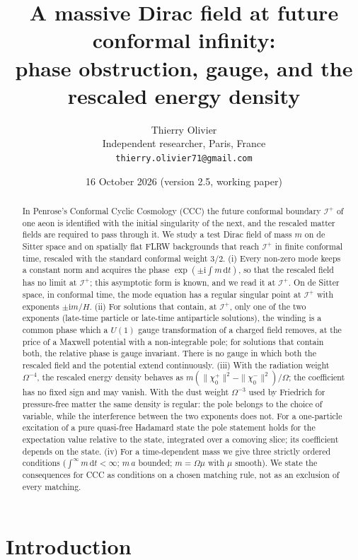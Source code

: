 \documentclass[11pt,a4paper]{article}
\title{\textbf{A massive Dirac field at future conformal infinity:\\ phase obstruction, gauge, and the rescaled energy density}}
\author{Thierry Olivier\\ \small Independent researcher, Paris, France\\ \small \texttt{thierry.olivier71@gmail.com}}
\date{16 October 2026 \quad (version 2.5, working paper)}
\theoremstyle{definition}
\newcommand{\scri}{\mathscr{I}^{+}}
\newcommand{\dd}{\mathrm{d}}
\newcommand{\ii}{\mathrm{i}}
\begin{document}
\maketitle

\begin{abstract}
In Penrose's Conformal Cyclic Cosmology (CCC) the future conformal boundary $\scri$ of one aeon is identified with the initial singularity of the next, and the rescaled matter fields are required to pass through it. We study a test Dirac field of mass $m$ on de Sitter space and on spatially flat FLRW backgrounds that reach $\scri$ in finite conformal time, rescaled with the standard conformal weight $3/2$. (i) Every non-zero mode keeps a constant norm and acquires the phase $\exp(\pm\ii\int m\,\dd t)$, so that the rescaled field has no limit at $\scri$; this asymptotic form is known, and we read it at $\scri$. On de Sitter space, in conformal time, the mode equation has a regular singular point at $\scri$ with exponents $\pm\ii m/H$. (ii) For solutions that contain, at $\scri$, only one of the two exponents (late-time particle or late-time antiparticle solutions), the winding is a common phase which a $U(1)$ gauge transformation of a charged field removes, at the price of a Maxwell potential with a non-integrable pole; for solutions that contain both, the relative phase is gauge invariant. There is no gauge in which both the rescaled field and the potential extend continuously. (iii) With the radiation weight $\Omega^{-4}$, the rescaled energy density behaves as $m(\|\chi_{0}^{+}\|^{2}-\|\chi_{0}^{-}\|^{2})/\Omega$; the coefficient has no fixed sign and may vanish. With the dust weight $\Omega^{-3}$ used by Friedrich for pressure-free matter the same density is regular: the pole belongs to the choice of variable, while the interference between the two exponents does not. For a one-particle excitation of a pure quasi-free Hadamard state the pole statement holds for the expectation value relative to the state, integrated over a comoving slice; its coefficient depends on the state. (iv) For a time-dependent mass we give three strictly ordered conditions ($\int^{\infty}m\,\dd t<\infty$; $m\,a$ bounded; $m=\Omega\mu$ with $\mu$ smooth). We state the consequences for CCC as conditions on a chosen matching rule, not as an exclusion of every matching.
\end{abstract}

\section{Introduction}
\end{document}

